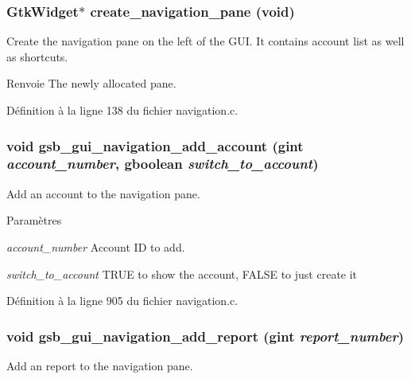 \subsubsection[{create\_\-navigation\_\-pane}]{\setlength{\rightskip}{0pt plus 5cm}GtkWidget$\ast$ create\_\-navigation\_\-pane (void)}\label{navigation_8c_a9213ab9c2e1f3d5d558517a5bac09a5b}
Create the navigation pane on the left of the GUI. It contains account list as well as shortcuts.

\begin{DoxyReturn}{Renvoie}
The newly allocated pane. 
\end{DoxyReturn}


Définition à la ligne 138 du fichier navigation.c.

\subsubsection[{gsb\_\-gui\_\-navigation\_\-add\_\-account}]{\setlength{\rightskip}{0pt plus 5cm}void gsb\_\-gui\_\-navigation\_\-add\_\-account (gint {\em account\_\-number}, \/  gboolean {\em switch\_\-to\_\-account})}\label{navigation_8c_acc4cb91805c595677dcc822498171ece}
Add an account to the navigation pane.


\begin{DoxyParams}{Paramètres}
\item[{\em account\_\-number}]Account ID to add. \item[{\em switch\_\-to\_\-account}]TRUE to show the account, FALSE to just create it \end{DoxyParams}


Définition à la ligne 905 du fichier navigation.c.

\subsubsection[{gsb\_\-gui\_\-navigation\_\-add\_\-report}]{\setlength{\rightskip}{0pt plus 5cm}void gsb\_\-gui\_\-navigation\_\-add\_\-report (gint {\em report\_\-number})}\label{navigation_8c_a6c19e82e10a0dd98a3a20290a3a873ec}
Add an report to the navigation pane.


